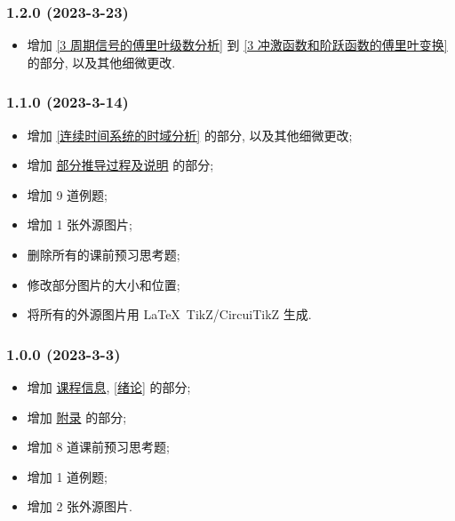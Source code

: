 \subsubsection*{1.2.0 (2023-3-23)}
\begin{itemize}
    \item 增加 \ref{3 周期信号的傅里叶级数分析} 到 \ref{3 冲激函数和阶跃函数的傅里叶变换} 的部分, 以及其他细微更改.
\end{itemize}

\subsubsection*{1.1.0 (2023-3-14)}
\begin{itemize}
    \item 增加 \ref{连续时间系统的时域分析} 的部分, 以及其他细微更改;
    \item 增加 \hyperref[部分推导过程及说明]{部分推导过程及说明} 的部分;
    \item 增加 9 道例题;
    \item 增加 1 张外源图片;
    \item 删除所有的课前预习思考题;
    \item 修改部分图片的大小和位置;
    \item 将所有的外源图片用 \LaTeX\ TikZ/CircuiTikZ 生成.
\end{itemize}

\subsubsection*{1.0.0 (2023-3-3)}
\begin{itemize}
    \item 增加 \hyperref[课程信息]{课程信息}, \ref{绪论} 的部分;
    \item 增加 \hyperref[附录]{附录} 的部分;
    \item 增加 8 道课前预习思考题;
    \item 增加 1 道例题;
    \item 增加 2 张外源图片.
\end{itemize}
